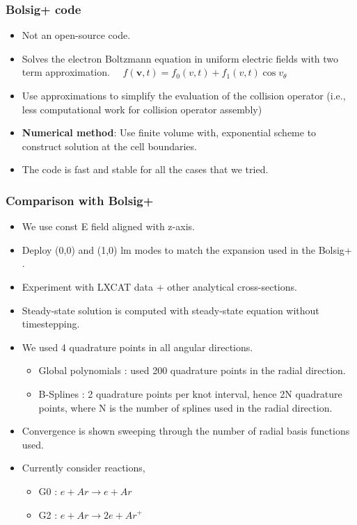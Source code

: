 \documentclass[mathserif, aspectratio=169]{beamer}
\newcommand{\vect}[1]{\boldsymbol{#1}}
\begin{document}
\begin{frame}
	\frametitle{Bolsig+ code}
	\begin{itemize}
		\item Not an open-source code. 
		\item Solves the electron Boltzmann equation in uniform electric fields with two term approximation.
		$
		\displaystyle
		\quad
		f(\vect{v},t) = f_0(v, t) + f_1(v,t)\cos v_\theta
		$ 
		\item Use approximations to simplify the evaluation of the collision operator (i.e., less computational work for collision operator assembly)
		\item \textbf{Numerical method}: Use finite volume with, exponential scheme to construct solution at the cell boundaries.  
		\item The code is fast and stable for all the cases that we tried. 
	\end{itemize}
\end{frame}

\begin{frame}
	\frametitle{Comparison with Bolsig+}
	\begin{itemize}
		\item We use const E field aligned with z-axis. 
		\item Deploy (0,0) and (1,0) lm modes to match the expansion used in the Bolsig+ .
		\item Experiment with LXCAT data + other analytical cross-sections. 
		\item Steady-state solution is computed with steady-state equation without timestepping. 
		\item We used 4 quadrature points in all angular directions. 
		\begin{itemize}
			\item Global polynomials : used 200 quadrature points in the radial direction. 
			\item B-Splines : 2 quadrature points per knot interval, hence 2N quadrature points, where N is the number of splines used in the radial direction. 
		\end{itemize}
		\item Convergence is shown sweeping through the number of radial basis functions used. 
		\item Currently consider reactions, 
		\begin{itemize}
			\item G0 : $e + Ar \rightarrow e + Ar$
			\item G2 : $e + Ar \rightarrow 2e + Ar^+$
		\end{itemize}
	\end{itemize}
\end{frame}
\end{document}
